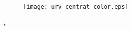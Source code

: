 \begin{titlepage}
    \begin{center}
        \textbf{
            \Large{\tfgAuthor}\\
            \vspace{30pt}
            \LARGE{\tfgTitle} \\
            \vspace{40pt}
            \large \tfgEducation \\
            \vspace{10pt}
            \large{\tfgType} \\
            \vspace{40pt}
            \tfgDirectedBy\\ \tfgDirectorTitle{} \tfgDirector \\
        }

        \vspace{260pt}


        \begin{figure}[H]
            \centering %
            \texttt{[image: urv-centrat-color.eps]}
        \end{figure}

        \large{\textbf{\tfgCity, \tfgYear}}
    \end{center}


    \thispagestyle{empty}
\end{titlepage}
